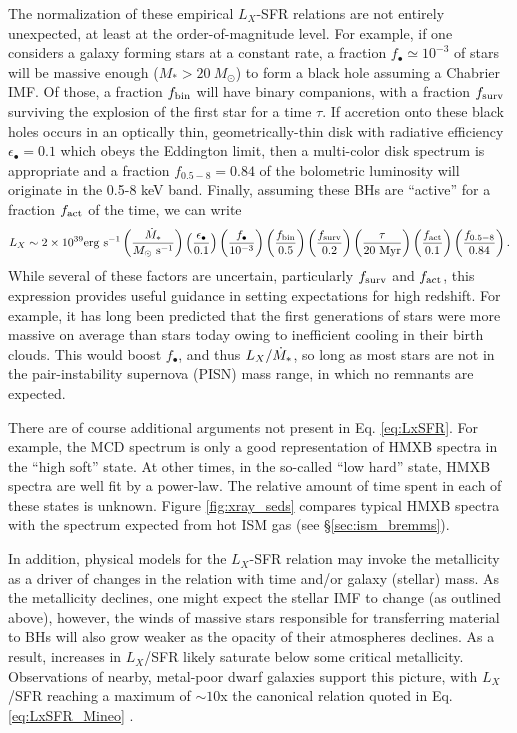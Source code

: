 The normalization of these empirical $L_X$-SFR relations are not entirely unexpected, at least at the order-of-magnitude level. For example, if one considers a galaxy forming stars at a constant rate, a fraction $f_{\bullet} \simeq 10^{-3}$ of stars will be massive enough ($M_{\ast} > 20 \ M_{\odot}$) to form a black hole assuming a Chabrier IMF. Of those, a fraction $f_{\text{bin}}$ will have binary companions, with a fraction $f_{\text{surv}}$ surviving the explosion of the first star for a time $\tau$. If accretion onto these black holes occurs in an optically thin, geometrically-thin disk with radiative efficiency $\epsilon_{\bullet} = 0.1$ which obeys the Eddington limit, then a multi-color disk spectrum is appropriate and a fraction $f_{0.5-8}=0.84$ of the bolometric luminosity will originate in the 0.5-8 keV band. Finally, assuming these BHs are ``active'' for a fraction $f_{\text{act}}$ of the time, we can write \cite{Mirabel2011,Mirocha2018}
\begin{equation}
	L_X \sim 2 \times 10^{39} \mathrm{erg} \ \mathrm{s}^{-1} \left(\frac{\SFR}{\SFRunits} \right) \left(\frac{\epsilon_{\bullet}}{0.1}\right) \left(\frac{f_{\bullet}}{10^{-3}} \right) \left(\frac{\fbin}{0.5} \right) \left(\frac{\fsurv}{0.2} \right) \left(\frac{\tau}{20 \ \mathrm{Myr}} \right) \left(\frac{\fact}{0.1} \right) \left(\frac{f_{0.5-8}}{0.84} \right) . \label{eq:LxSFR}
\end{equation}
While several of these factors are uncertain, particularly $f_{\text{surv}}$ and $f_{\text{act}}$, this expression provides useful guidance in setting expectations for high redshift. For example, it has long been predicted that the first generations of stars were more massive on average than stars today owing to inefficient cooling in their birth clouds. This would boost $f_{\bullet}$, and thus $L_X/\dot{M}_{\ast}$, so long as most stars are not in the pair-instability supernova (PISN) mass range, in which no remnants are expected. 

There are of course additional arguments not present in Eq. \ref{eq:LxSFR}. For example, the MCD spectrum is only a good representation of HMXB spectra in the ``high soft'' state. At other times, in the so-called ``low hard'' state, HMXB spectra are well fit by a power-law. The relative amount of time spent in each of these states is unknown. Figure \ref{fig:xray_seds} compares typical HMXB spectra with the spectrum expected from hot ISM gas (see \S\ref{sec:ism_bremms}).

In addition, physical models for the $L_X$-SFR relation may invoke the metallicity as a driver of changes in the relation with time and/or galaxy (stellar) mass. As the metallicity declines, one might expect the stellar IMF to change (as outlined above), however, the winds of massive stars responsible for transferring material to BHs will also grow weaker as the opacity of their atmospheres declines. As a result, increases in $L_X$/SFR likely saturate below some critical metallicity. Observations of nearby, metal-poor dwarf galaxies support this picture, with $L_X$/SFR reaching a maximum of $\sim 10$x the canonical relation quoted in Eq. \ref{eq:LxSFR_Mineo} \cite{Mineo2012a}.

